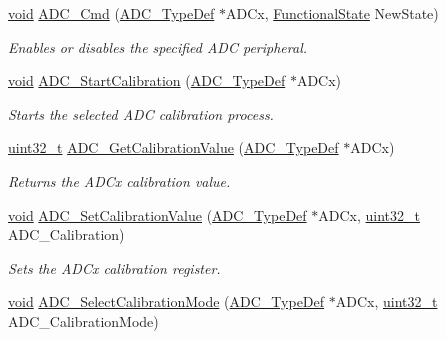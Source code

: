 \begin{DoxyCompactItemize}
\hyperlink{group___n_a_m_e_ga18028b8badbf1ea7e704ccac3c488e82}{void} \hyperlink{group___a_d_c___group1_ga40882d399e3371755ed610c1134e634e}{A\-D\-C\-\_\-\-Cmd} (\hyperlink{struct_a_d_c___type_def}{A\-D\-C\-\_\-\-Type\-Def} $\ast$A\-D\-Cx, \hyperlink{group___exported__types_gac9a7e9a35d2513ec15c3b537aaa4fba1}{Functional\-State} New\-State)
\begin{DoxyCompactList}\small\item\em Enables or disables the specified A\-D\-C peripheral. \end{DoxyCompactList}\item 
\hyperlink{group___n_a_m_e_ga18028b8badbf1ea7e704ccac3c488e82}{void} \hyperlink{group___a_d_c___group1_gadcba6341124a6aabfd2dd885ca8e5f14}{A\-D\-C\-\_\-\-Start\-Calibration} (\hyperlink{struct_a_d_c___type_def}{A\-D\-C\-\_\-\-Type\-Def} $\ast$A\-D\-Cx)
\begin{DoxyCompactList}\small\item\em Starts the selected A\-D\-C calibration process. \end{DoxyCompactList}\item 
\hyperlink{stdint_8h_a435d1572bf3f880d55459d9805097f62}{uint32\-\_\-t} \hyperlink{group___a_d_c___group1_gaf53dfffb144a9f75124c08e849aeebe7}{A\-D\-C\-\_\-\-Get\-Calibration\-Value} (\hyperlink{struct_a_d_c___type_def}{A\-D\-C\-\_\-\-Type\-Def} $\ast$A\-D\-Cx)
\begin{DoxyCompactList}\small\item\em Returns the A\-D\-Cx calibration value. \end{DoxyCompactList}\item 
\hyperlink{group___n_a_m_e_ga18028b8badbf1ea7e704ccac3c488e82}{void} \hyperlink{group___a_d_c___group1_gaf6c83aa3815a6db50f2798cb4c5da725}{A\-D\-C\-\_\-\-Set\-Calibration\-Value} (\hyperlink{struct_a_d_c___type_def}{A\-D\-C\-\_\-\-Type\-Def} $\ast$A\-D\-Cx, \hyperlink{stdint_8h_a435d1572bf3f880d55459d9805097f62}{uint32\-\_\-t} A\-D\-C\-\_\-\-Calibration)
\begin{DoxyCompactList}\small\item\em Sets the A\-D\-Cx calibration register. \end{DoxyCompactList}\item 
\hyperlink{group___n_a_m_e_ga18028b8badbf1ea7e704ccac3c488e82}{void} \hyperlink{group___a_d_c___group1_gadeaec15406bee7a55a4151f5af33c0e9}{A\-D\-C\-\_\-\-Select\-Calibration\-Mode} (\hyperlink{struct_a_d_c___type_def}{A\-D\-C\-\_\-\-Type\-Def} $\ast$A\-D\-Cx, \hyperlink{stdint_8h_a435d1572bf3f880d55459d9805097f62}{uint32\-\_\-t} A\-D\-C\-\_\-\-Calibration\-Mode)

\end{DoxyCompactItemize}
